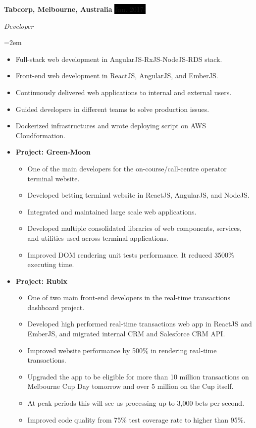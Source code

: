 \documentclass[a4paper, 11pt]{article}
\newcommand{\EducationEntry}[4]{
		\noindent \textbf{#1} \hfill      %
		\colorbox{White}{%
			\parbox{5cm}{%
			\hfill\color{Black}#2}} \par  %
		\noindent \textit{#3} \par        %
		\noindent\hangindent=2em\hangafter=0 \small #4 %
		\normalsize \par}
\newcommand{\WorkEntry}[4]{				  %
		\noindent \textbf{#1} \hfill      %
		\noindent\colorbox{Black}{\color{White}#2} \par  %
		\noindent \textit{#3} \par              %
		\noindent\hangindent=2em\hangafter=0 \small #4 %
		\normalsize \par}
\begin{document}
\WorkEntry{Tabcorp, Melbourne, Australia}{Jan. 2017-}{Developer}{
\begin{itemize}
	\item {Full-stack web development in AngularJS-RxJS-NodeJS-RDS stack.}
	\item {Front-end web development in ReactJS, AngularJS, and EmberJS.}
	\item {Continuously delivered web applications to internal and external users.}
	\item {Guided developers in different teams to solve production issues.}
	\item {Dockerized infrastructures and wrote deploying script on AWS Cloudformation.}
	\item []{
		\textbf{Project: Green-Moon}
		\begin{itemize}
			\item {One of the main developers for the on-course/call-centre operator terminal website.}
			\item {Developed betting terminal website in ReactJS, AngularJS, and NodeJS.}
			\item {Integrated and maintained large scale web applications.}
			\item {Developed multiple consolidated libraries of web components, services, and utilities used across terminal applications.}
			\item {Improved DOM rendering unit tests performance. It reduced 3500\% executing time.}
		\end{itemize}
	}
	\item []{
		\textbf{Project: Rubix}
		\begin{itemize}
			\item {One of two main front-end developers in the real-time transactions dashboard project.}
			\item {Developed high performed real-time transactions web app in ReactJS and EmberJS, and migrated internal CRM and Salesforce CRM API.}
			\item {Improved website performance by 500\% in rendering real-time transactions.}
			\item {Upgraded the app to be eligible for more than 10 million transactions on Melbourne Cup Day tomorrow and over 5 million on the Cup itself.}
			\item {At peak periods this will see us processing up to 3,000 bets per second.}
			\item {Improved code quality from 75\% test coverage rate to higher than 95\%.}
		\end{itemize}
	}
\end{itemize}
}
\end{document}
